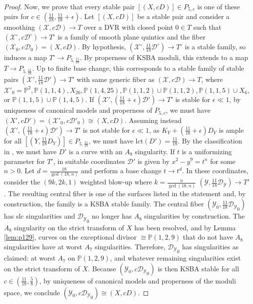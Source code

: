 \documentclass[11pt]{amsart}
\numberwithin{equation}{section}
\theoremstyle{definition}
\newcommand{\calY}{\mathcal{Y}}
\newcommand{\calX}{\mathcal{X}}
\newcommand{\bP}{\mathbb{P}}
\newcommand{\calD}{\mathcal{D}}
\newcommand{\lct}{\mathrm{lct}}
\begin{document}
\begin{proof}
    Now, we prove that every stable pair $[(X,cD)] \in P_{5,c}$ is one of these pairs for $c \in (\frac{11}{18},\frac{11}{18}+\epsilon)$.  Let $[(X,cD)]$ be a stable pair and consider a smoothing $(\calX, c \calD) \to T$ over a DVR with closed point $0 \in T$ such that $(\calX^\circ, c\calD^\circ) \to T^\circ$ is a family of smooth plane quintics and the fiber $(\calX_0, c\calD_0) = (X,cD)$.  By hypothesis, $(\calX^\circ, \frac{11}{18}\calD^\circ) \to T^\circ$ is a stable family, so induces a map $T^\circ \to P_{5,\frac{11}{18}}$.  By properness of KSBA moduli, this extends to a map $T \to P_{5,\frac{11}{18}}$.  Up to finite base change, this corresponds to a stable family of stable pairs $(\calX', \frac{11}{18} \calD') \to T'$ with same generic fiber as $(\calX, c \calD) \to T$, where $\calX'_0 = \bP^2, \bP(1,1,4), X_{26}, \bP(1,4,25), \bP(1,1,2) \cup \bP(1,1,2), \bP(1,1,5) \cup X_6,$ or $\bP(1,1,5) \cup \bP(1,4,5)$.  If $(\calX', (\frac{11}{18}+ \epsilon) \calD') \to T'$ is stable for $\epsilon \ll 1$, by uniqueness of canonical models and properness of $P_{5,c}$, we must have $(X',cD')= (\calX'_0, c\calD'_0) \cong (X,cD)$. Assuming instead $(\calX', (\frac{11}{18}+ \epsilon) \calD') \to T'$ is not stable for $\epsilon \ll 1$, as $K_Y+(\frac{11}{18}+\epsilon)D_Y$ is ample for all $[(Y, \frac{11}{18}D_Y)] \in P_{5,\frac{11}{18}}$, we must have $\lct(D') = \frac{11}{18}$.  By the classification in \cite[Section 11]{hacking}, we must have $D'$ is a curve with an $A_8$ singularity.  If $t$ is a uniformizing parameter for $T'$, in suitable coordinates $\calD'$ is given by $x^2 - y^9 = t^n$ for some $n > 0$.  Let $d = \frac{18}{\gcd(18,n)}$ and perform a base change $t \to t^{d}$. In these coordinates, consider the $(9k,2k,1)$ weighted blow-up where $k = \frac{n}{\gcd(18,n)}$ $(\calY, \frac{11}{18} \calD_{\calY}) \to T'$. The resulting central fiber is one of the surfaces listed in the statement and, by construction, the family is a KSBA stable family.  The central fiber $(\calY_0, \frac{11}{18}{\calD_\calY}_0)$ has slc singularities and ${\calD_\calY}_0$ no longer has $A_8$ singularities by construction.  The $A_8$ singularity on the strict transform of $X$ has been resolved, and by Lemma \ref{lem:p129}, curves on the exceptional divisor $\cong \bP(1,2,9)$ that do not have $A_8$ singularities have at worst $A_7$ singularities.  Therefore, ${\calD_\calY}_0$ has singularities as claimed: at worst $A_7$ on $\bP(1,2,9)$, and whatever remaining singularities exist on the strict transform of $X$.  Because $(\calY_0, c{\calD_\calY}_0)$ is then KSBA stable for all $c \in (\frac{11}{18}, \frac{5}{8})$, by uniqueness of canonical models and properness of the moduli space, we conclude $(\calY_0, c{\calD_\calY}_0) \cong (X,cD)$.  
\end{proof}
\end{document}
